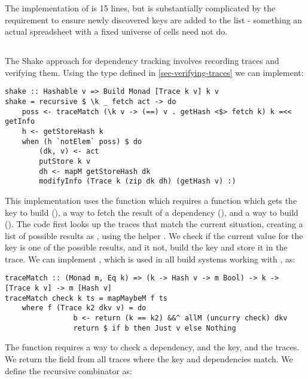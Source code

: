 The implementation of  is 15 lines, but is substantially complicated by the requirement to ensure newly discovered keys are added to the list - something an actual spreadsheet with a fixed universe of cells need not do.

\subsection{\Shake}\label{sec-implementation-shake}


The Shake approach for dependency tracking involves recording traces and verifying them. Using the  type defined in \ref{sec-verifying-traces} we can implement:

\begin{verbatim}
shake :: Hashable v => Build Monad [Trace k v] k v
shake = recursive $ \k _ fetch act -> do
    poss <- traceMatch (\k v -> (==) v . getHash <$> fetch k) k =<< getInfo
    h <- getStoreHash k
    when (h `notElem` poss) $ do
        (dk, v) <- act
        putStore k v
        dh <- mapM getStoreHash dk
        modifyInfo (Trace k (zip dk dh) (getHash v) :)
\end{verbatim}

This implementation uses the  function which requires a function which gets the key to build (), a way to fetch the result of a dependency (), and a way to build  (). The code first looks up the traces that match the current situation, creating a list of possible results as , using the helper . We check if the current value for the key is one of the possible results, and it not, build the key and store it in the trace. We can implement , which is used in all build systems working with , as:

\begin{verbatim}
traceMatch :: (Monad m, Eq k) => (k -> Hash v -> m Bool) -> k -> [Trace k v] -> m [Hash v]
traceMatch check k ts = mapMaybeM f ts
    where f (Trace k2 dkv v) = do
                b <- return (k == k2) &&^ allM (uncurry check) dkv
                return $ if b then Just v else Nothing
\end{verbatim}

The function  requires a way to check a dependency, and the key, and the traces. We return the  field from all traces where the key and dependencies match. We define the recursive combinator as:

